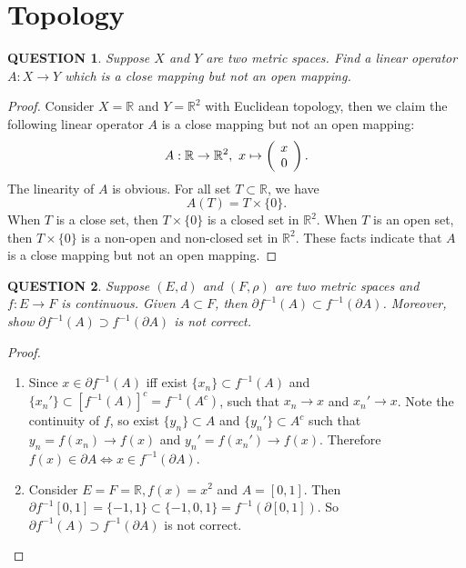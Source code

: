 \documentclass[12pt]{article}
\renewcommand{\(}{\left(}%
\renewcommand{\)}{\right)}%
\renewcommand{\[}{\left[}%
\renewcommand{\]}{\right]}%
\renewcommand{\r}{\mathbb{R}}
\newtheorem{question}{QUESTION}[section]}
\newtheorem{proof}{Proof.}}
\begin{document}
  \section{Topology}
  \begin{question}
   Suppose $X$ and $Y$ are two metric spaces. Find a linear operator $A:X\to Y$ which is a close mapping but not an open mapping.
  \end{question}
  \begin{proof}
   Consider $X=\r$ and $Y=\r^2$ with Euclidean topology, then we claim the following linear operator $A$ is a close mapping but not an open mapping:
   \begin{equation*}
    A:\r\to\r^2,~x\mapsto\begin{pmatrix}
     \hspace{0.15cm} x \hspace{0.15cm}\\
     \hspace{0.15cm} 0 \hspace{0.15cm}
    \end{pmatrix}.
   \end{equation*}
   The linearity of $A$ is obvious. For all set $T\subset \r$, we have
   \begin{equation*}
    A(T)=T\times\{0\}.
   \end{equation*}
   When $T$ is a close set, then $T\times\{0\}$ is a closed set in $\r^2$. When $T$ is an open set, then $T\times\{0\}$ is a non-open and non-closed set in $\r^2$. These facts indicate that $A$  is a close mapping but not an open mapping.
  \end{proof}

  \begin{question}
   Suppose $(E,d)$ and $(F,\rho )$ are two metric spaces and $f:E\to F$ is continuous. Given $A\subset F$, then $\partial f^{-1}(A)\subset f^{-1}(\partial A)$. Moreover, show $\partial f^{-1}(A)\supset f^{-1}(\partial A)$ is not correct.
  \end{question}
  \begin{proof}
   \begin{enumerate}
    \item Since $x\in \partial f^{-1}(A)$ iff exist $\{x_n\}\subset f^{-1}(A)$ and $\{x_n'\}\subset[f^{-1}(A)]^c=f^{-1}(A^c)$, such that $x_n\to x$ and $x_n'\to x$. Note the continuity of $f$, so  exist $\{y_n\}\subset A$ and $\{y_n'\}\subset A^c$ such that $y_n=f(x_n)\to f(x)$ and $y_n'=f(x_n')\to f(x)$. Therefore $f(x)\in \partial A\Longleftrightarrow x\in f^{-1}(\partial A )$.
    \item Consider $E=F=\r,f(x)=x^2$ and $A=[0,1]$. Then $\partial f^{-1}[0,1]=\{-1,1\}\subset \{-1,0,1\}=f^{-1}(\partial[0,1] )$. So  $\partial f^{-1}(A)\supset f^{-1}(\partial A)$ is not correct.
   \end{enumerate}
  \end{proof}
  
\end{document}
